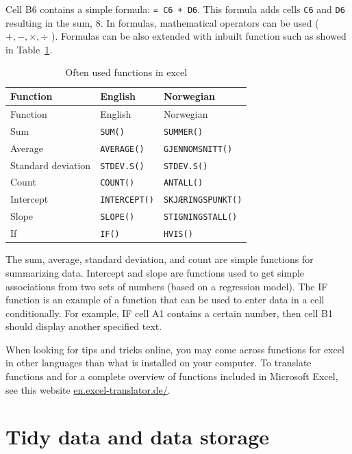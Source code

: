 \documentclass[
  11pt,
  letterpaper,
]{scrbook}
\begin{document}
Cell B6 contains a simple formula: \texttt{=\ C6\ +\ D6}. This formula
adds cells \texttt{C6} and \texttt{D6} resulting in the sum, 8. In
formulas, mathematical operators can be used (\(+, -, \times , \div\) ).
Formulas can be also extended with inbuilt function such as showed in
Table~\ref{tbl-excelfunctions}.

\hypertarget{tbl-excelfunctions}{}
\begin{longtable}[]{@{}lll@{}}
\caption{\label{tbl-excelfunctions}Often used functions in
excel}\tabularnewline
\toprule\noalign{}
Function & English & Norwegian \\
\midrule\noalign{}
\endfirsthead
\toprule\noalign{}
Function & English & Norwegian \\
\midrule\noalign{}
\endhead
\bottomrule\noalign{}
\endlastfoot
Sum & \texttt{SUM()} & \texttt{SUMMER()} \\
Average & \texttt{AVERAGE()} & \texttt{GJENNOMSNITT()} \\
Standard deviation & \texttt{STDEV.S()} & \texttt{STDEV.S()} \\
Count & \texttt{COUNT()} & \texttt{ANTALL()} \\
Intercept & \texttt{INTERCEPT()} & \texttt{SKJÆRINGSPUNKT()} \\
Slope & \texttt{SLOPE()} & \texttt{STIGNINGSTALL()} \\
If & \texttt{IF()} & \texttt{HVIS()} \\
\end{longtable}

The sum, average, standard deviation, and count are simple functions for
summarizing data. Intercept and slope are functions used to get simple
associations from two sets of numbers (based on a regression model). The
IF function is an example of a function that can be used to enter data
in a cell conditionally. For example, IF cell A1 contains a certain
number, then cell B1 should display another specified text.

When looking for tips and tricks online, you may come across functions
for excel in other languages than what is installed on your computer. To
translate functions and for a complete overview of functions included in
Microsoft Excel, see this website
\href{https://en.excel-translator.de/}{en.excel-translator.de/}.

\hypertarget{tidy-data-and-data-storage}{%
\section{Tidy data and data storage}\label{tidy-data-and-data-storage}}
\end{document}
